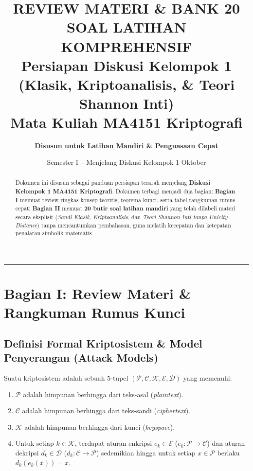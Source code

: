 \documentclass[11pt,a4paper]{article}
\title{\vspace{-1.2cm}\textbf{\Large REVIEW MATERI \& BANK 20 SOAL LATIHAN KOMPREHENSIF}\\\large Persiapan Diskusi Kelompok 1 (Klasik, Kriptoanalisis, \& Teori Shannon Inti)\\\large\textbf{Mata Kuliah MA4151 Kriptografi}}
\author{\textbf{Disusun untuk Latihan Mandiri \& Penguasaan Cepat}}
\date{Semester I -- Menjelang Diskusi Kelompok 1 Oktober}
\begin{document}
\maketitle
\vspace{-0.5cm}

\begin{abstract}
Dokumen ini disusun sebagai panduan persiapan terarah menjelang \textbf{Diskusi Kelompok 1 MA4151 Kriptografi}. Dokumen terbagi menjadi dua bagian: \textbf{Bagian I} memuat review ringkas konsep teoritis, teorema kunci, serta tabel rangkuman rumus cepat; \textbf{Bagian II} memuat \textbf{20 butir soal latihan mandiri} yang telah dilabeli materi secara eksplisit (\textit{Sandi Klasik}, \textit{Kriptoanalisis}, dan \textit{Teori Shannon Inti tanpa Unicity Distance}) tanpa mencantumkan pembahasan, guna melatih kecepatan dan ketepatan penalaran simbolik matematis.
\end{abstract}

\vspace{0.2cm}
\hrule
\vspace{0.3cm}

\tableofcontents
\newpage

\section{Bagian I: Review Materi \& Rangkuman Rumus Kunci}

\subsection{Definisi Formal Kriptosistem \& Model Penyerangan (Attack Models)}

Suatu kriptosistem adalah sebuah 5-tupel $(\mathcal{P}, \mathcal{C}, \mathcal{K}, \mathcal{E}, \mathcal{D})$ yang memenuhi:
\begin{enumerate}[leftmargin=*]
    \item $\mathcal{P}$ adalah himpunan berhingga dari teks-asal (\textit{plaintext}).
    \item $\mathcal{C}$ adalah himpunan berhingga dari teks-sandi (\textit{ciphertext}).
    \item $\mathcal{K}$ adalah himpunan berhingga dari kunci (\textit{keyspace}).
    \item Untuk setiap $k \in \mathcal{K}$, terdapat aturan enkripsi $e_k \in \mathcal{E}$ ($e_k: \mathcal{P} \to \mathcal{C}$) dan aturan dekripsi $d_k \in \mathcal{D}$ ($d_k: \mathcal{C} \to \mathcal{P}$) sedemikian hingga untuk setiap $x \in \mathcal{P}$ berlaku $d_k(e_k(x)) = x$.
\end{enumerate}
\end{document}
